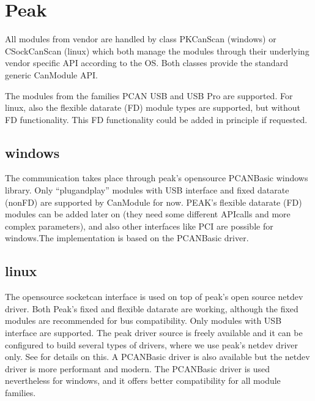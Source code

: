 \documentclass[a4paper,10pt,english]{sphinxmanual}
\begin{document}
\chapter{Peak}
\label{\detokenize{vendors/peak:peak}}\label{\detokenize{vendors/peak::doc}}
\sphinxAtStartPar
All modules from vendor {\hyperref[\detokenize{vendors/peak:peak}]{}} are handled by class PKCanScan (windows) or CSockCanScan (linux) which
both manage the modules through their underlying vendor specific API according to the OS.
Both classes provide the standard generic CanModule API.

\sphinxAtStartPar
The modules from the families PCAN USB and USB Pro are supported. For linux, also the flexible
datarate (FD) module types are supported, but without FD functionality. This FD functionality
could be added in principle if requested.


\section{windows}
\label{\detokenize{vendors/peak:windows}}
\sphinxAtStartPar
The communication takes place through peak’s open\sphinxhyphen{}source PCAN\sphinxhyphen{}Basic windows library. Only “plug\sphinxhyphen{}and\sphinxhyphen{}play”
modules with USB interface and fixed datarate (non\sphinxhyphen{}FD) are supported by CanModule for now. PEAK’s
flexible datarate (FD) modules can be added later on (they need some different API\sphinxhyphen{}calls and more complex parameters), and also
other interfaces like PCI are possible for windows.The implementation is based on the PCAN\sphinxhyphen{}Basic driver.


\section{linux}
\label{\detokenize{vendors/peak:linux}}
\sphinxAtStartPar
The open\sphinxhyphen{}source socketcan interface is used on top of peak’s open source netdev driver. Both Peak’s
fixed and flexible datarate are working, although the fixed modules are recommended for bus compatibility.
Only modules with USB interface are supported.
The peak driver source is freely available and it can be configured to build several
types of drivers, where we use peak’s netdev driver only. See  for details on this.
A PCAN\sphinxhyphen{}Basic driver is also available but the netdev driver is more performant and modern. The
PCAN\sphinxhyphen{}Basic driver is used nevertheless for windows, and it offers better compatibility for all module
families.
\end{document}
